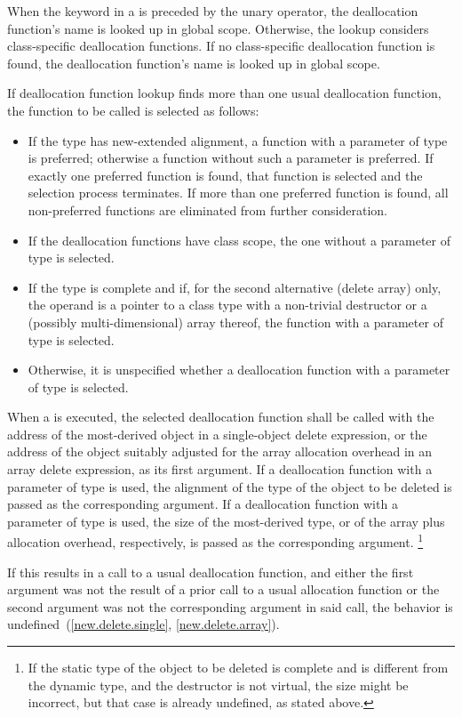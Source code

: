 \pnum
When the keyword  in a  is
preceded by the unary \tcode{::} operator, the deallocation function's name is looked
up in global scope. Otherwise, the lookup considers class-specific deallocation
functions. If no class-specific deallocation function is found,
the deallocation function's name is looked up in global scope.

\pnum
If deallocation function lookup finds more than one usual
deallocation function,
the function to be called is selected as follows:
\begin{itemize}
\item
If the type has new-extended alignment,
a function with a parameter of type  is preferred;
otherwise a function without such a parameter is preferred.
If exactly one preferred function is found,
that function is selected and the selection process terminates.
If more than one preferred function is found,
all non-preferred functions are eliminated from further consideration.
\item
If the deallocation functions have class scope,
the one without a parameter of type  is selected.
\item
If the type is complete and if, for the second alternative (delete
array) only, the operand is a pointer to a class type with a
non-trivial destructor or a (possibly multi-dimensional) array thereof,
the function with a parameter of type  is selected.
\item
Otherwise, it is unspecified
whether a deallocation function with a parameter of type 
is selected.
\end{itemize}

\pnum
When a 
is executed, the selected deallocation function shall be called with
the address of the most-derived object in a single-object delete expression, or
the address of the object suitably adjusted for the array allocation
overhead in an array delete expression,
as its first argument.
If a deallocation function
with a parameter of type 
is used,
the alignment of the type of the object to be deleted
is passed as the corresponding argument.
If a deallocation function
with a parameter of type  is used,
the size
of the most-derived type, or
of the array plus allocation overhead, respectively,
is passed as the corresponding argument.%
\footnote{If the static type of the object to be deleted is complete
and is different from the dynamic type, and the destructor is not virtual, the size might
be incorrect, but that case is already undefined, as stated above.}
\begin{note}
If this results in a call to a usual deallocation function, and either
the first argument was not the result of
a prior call to a usual allocation function or
the second argument was not the corresponding argument in said call,
the behavior is undefined~(\ref{new.delete.single}, \ref{new.delete.array}).
\end{note}

